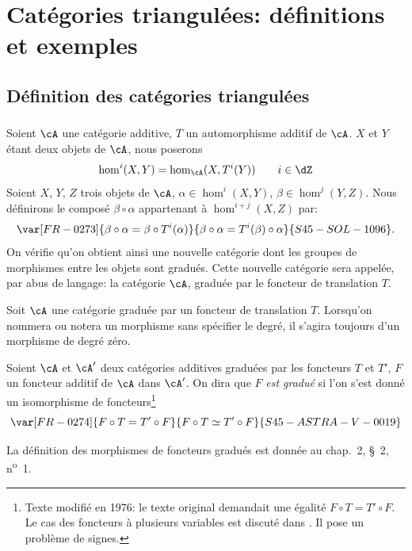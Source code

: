 \section{Catégories triangulées: définitions et exemples}\label{VIII:1}





\subsection{Définition des catégories triangulées}\label{VIII:1-1}


\addtocounter{subsubsection}{-1}
\subsubsection{}\label{VIII:1-1-0}

Soient $\cA$ une catégorie additive, $T$ un automorphisme additif de $\cA$. 
$X$ et $Y$ étant deux objets de $\cA$, nous poserons 
\[
  \hom^i(X,Y) = \hom_\cA(X,T^i(Y)) \qquad i\in \dZ 
\]
Soient $X$, $Y$, $Z$ trois objets de $\cA$, $\alpha\in \hom^i(X,Y)$, 
$\beta\in \hom^j(Y,Z)$. Nous définirons le composé $\beta\circ\alpha$ 
appartenant à $\hom^{i+j}(X,Z)$ par: 
\[
  \var[FR-0273]{\beta\circ \alpha = \beta\circ T^i(\alpha)}{\beta\circ \alpha = T^i(\beta)\circ\alpha}{S45-SOL-1096} \text{.}
\]
On vérifie qu'on obtient ainsi une nouvelle catégorie dont les groupes de 
morphismes entre les objets sont gradués. Cette nouvelle catégorie sera 
appelée, par abus de langage: la catégorie $\cA$, graduée par le foncteur 
de translation $T$. 

Soit $\cA$ une catégorie graduée par un foncteur de translation $T$. 
Lorsqu'on nommera ou notera un morphisme sans spécifier le degré, il 
s'agira toujours d'un morphisme de degré zéro. 

Soient $\cA$ et $\cA'$ deux catégories additives graduées par les foncteurs
$T$ et $T'$, $F$ un foncteur additif de $\cA$ dans $\cA'$. On dira que $F$ 
\emph{est gradué} si l'on s'est donné un isomorphisme de 
foncteurs\footnote{Texte modifié en 1976: le texte original demandait une 
égalité $F\circ T=T'\circ F$. Le cas des foncteurs à plusieurs variables 
est discuté dans . Il pose un problème de signes.} 
\[
  \var[FR-0274]{F\circ T = T'\circ F}{F\circ T \simeq T'\circ F}{S45-ASTRA-V-0019} 
\]

La définition des morphismes de foncteurs gradués est donnée au 
chap.~2, \S~2, n\textsuperscript{o}~1. 

